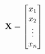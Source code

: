 \documentclass[preview]{standalone}
\begin{document}
\begin{align*}
\special{dvisvgm:raw <g id='unique000'>}\mathbf{X} = \begin{bmatrix} x_1 \\ x_2 \\ \vdots \\ x_n \end{bmatrix}\special{dvisvgm:raw </g>}
\end{align*}
\end{document}
